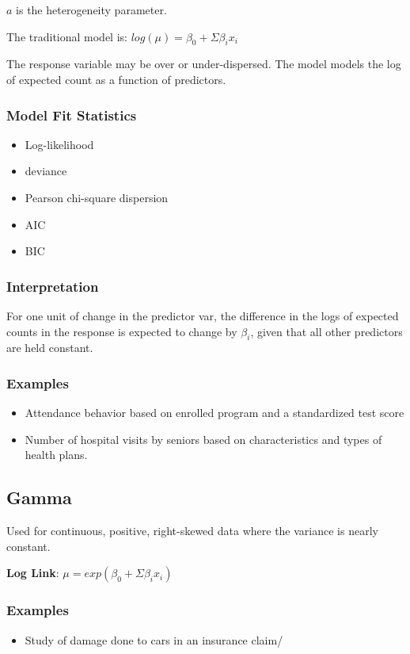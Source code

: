 \documentclass[11pt]{article}
\begin{document}
\(a\) is the heterogeneity parameter.

The traditional model is: \(log(\mu) = \beta_0 + \Sigma \beta_i x_i\)

The response variable may be over or under-dispersed.
The model models the log of expected count as a function of predictors.

\subsubsection{Model Fit Statistics}
\label{sec:orgba142e2}
\begin{itemize}
\item Log-likelihood
\item deviance
\item Pearson chi-square dispersion
\item AIC
\item BIC
\end{itemize}

\subsubsection{Interpretation}
\label{sec:orga316ea4}
For one unit of change in the predictor var, the difference in the logs of
expected counts in the response is expected to change by \(\beta_i\), given that
all other predictors are held constant.

\subsubsection{Examples}
\label{sec:orgd8243fc}
\begin{itemize}
\item Attendance behavior based on enrolled program and a standardized test score
\item Number of hospital visits by seniors based on characteristics and types of
health plans.
\end{itemize}
\subsection{Gamma}
\label{sec:org607952a}
Used for continuous, positive, right-skewed data where the variance is nearly
constant.

\textbf{Log Link}: \(\mu = exp(\beta_0 + \Sigma \beta_i x_i)\)
\subsubsection{Examples}
\label{sec:org9e30212}
\begin{itemize}
\item Study of damage done to cars in an insurance claim/
\end{itemize}
\end{document}
